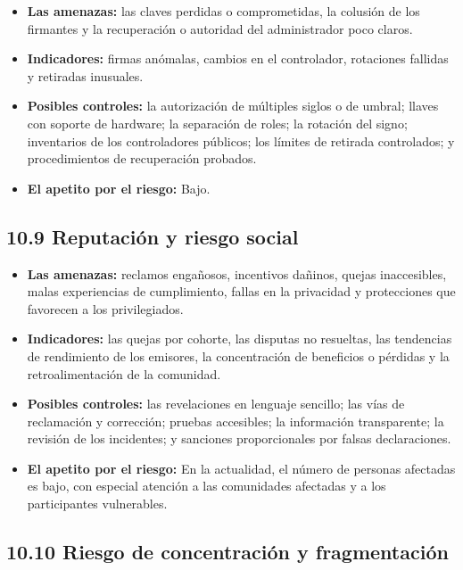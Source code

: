 \documentclass[11pt]{article}
\begin{document}
\begin{itemize}[leftmargin=*]
\item \textbf{Las amenazas:} las claves perdidas o comprometidas, la colusión de los firmantes y la recuperación o autoridad del administrador poco claros.
\item \textbf{Indicadores:} firmas anómalas, cambios en el controlador, rotaciones fallidas y retiradas inusuales.
\item \textbf{Posibles controles:} la autorización de múltiples siglos o de umbral; llaves con soporte de hardware; la separación de roles; la rotación del signo; inventarios de los controladores públicos; los límites de retirada controlados; y procedimientos de recuperación probados.
\item \textbf{El apetito por el riesgo:} Bajo.
\end{itemize}
\subsection*{10.9 Reputación y riesgo social}

\begin{itemize}[leftmargin=*]
\item \textbf{Las amenazas:} reclamos engañosos, incentivos dañinos, quejas inaccesibles, malas experiencias de cumplimiento, fallas en la privacidad y protecciones que favorecen a los privilegiados.
\item \textbf{Indicadores:} las quejas por cohorte, las disputas no resueltas, las tendencias de rendimiento de los emisores, la concentración de beneficios o pérdidas y la retroalimentación de la comunidad.
\item \textbf{Posibles controles:} las revelaciones en lenguaje sencillo; las vías de reclamación y corrección; pruebas accesibles; la información transparente; la revisión de los incidentes; y sanciones proporcionales por falsas declaraciones.
\item \textbf{El apetito por el riesgo:} En la actualidad, el número de personas afectadas es bajo, con especial atención a las comunidades afectadas y a los participantes vulnerables.
\end{itemize}
\subsection*{10.10 Riesgo de concentración y fragmentación}
\end{document}
